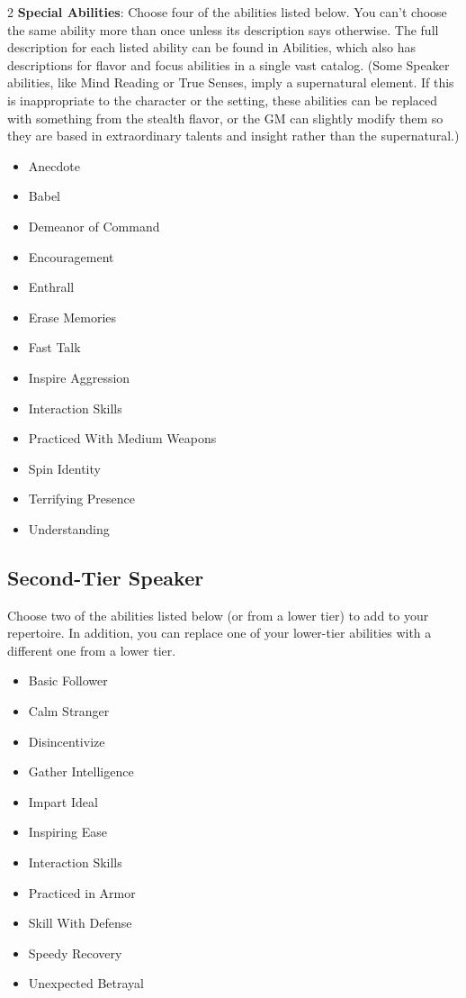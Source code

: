 \begin{multicols}{2}
\textbf{Special Abilities}: Choose four of the abilities listed below. You can’t choose the same ability more than once unless its description says otherwise. The full description for each listed ability can be found in Abilities, which also has descriptions for flavor and focus abilities in a single vast catalog. (Some Speaker abilities, like Mind Reading or True Senses, imply a supernatural element. If this is inappropriate to the character or the setting, these abilities can be replaced with something from the stealth flavor, or the GM can slightly modify them so they are based in extraordinary talents and insight rather than the supernatural.)

\begin{itemize}
\item Anecdote
\item Babel
\item Demeanor of Command
\item Encouragement
\item Enthrall
\item Erase Memories
\item Fast Talk
\item Inspire Aggression
\item Interaction Skills
\item Practiced With Medium Weapons 
\item Spin Identity
\item Terrifying Presence
\item Understanding
\end{itemize}

\subsection{Second-Tier Speaker}

Choose two of the abilities listed below (or from a lower tier) to add to your repertoire. In addition, you can replace one of your lower-tier abilities with a different one from a lower tier.

\begin{itemize}
\item Basic Follower
\item Calm Stranger
\item Disincentivize
\item Gather Intelligence
\item Impart Ideal
\item Inspiring Ease
\item Interaction Skills
\item Practiced in Armor
\item Skill With Defense
\item Speedy Recovery
\item Unexpected Betrayal
\end{itemize}


\end{multicols}
